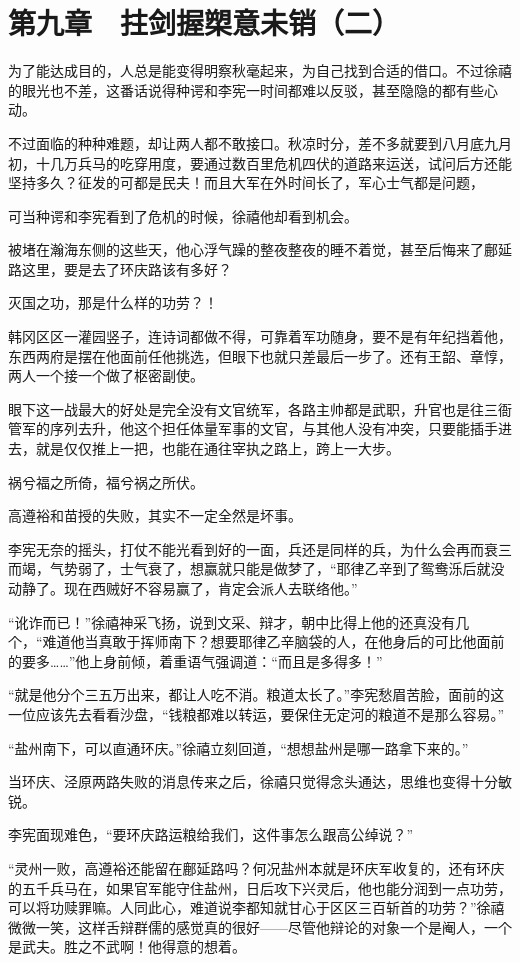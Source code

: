 \section{第九章　拄剑握槊意未销（二）}

为了能达成目的，人总是能变得明察秋毫起来，为自己找到合适的借口。不过徐禧的眼光也不差，这番话说得种谔和李宪一时间都难以反驳，甚至隐隐的都有些心动。

不过面临的种种难题，却让两人都不敢接口。秋凉时分，差不多就要到八月底九月初，十几万兵马的吃穿用度，要通过数百里危机四伏的道路来运送，试问后方还能坚持多久？征发的可都是民夫！而且大军在外时间长了，军心士气都是问题，

可当种谔和李宪看到了危机的时候，徐禧他却看到机会。

被堵在瀚海东侧的这些天，他心浮气躁的整夜整夜的睡不着觉，甚至后悔来了鄜延路这里，要是去了环庆路该有多好？

灭国之功，那是什么样的功劳？！

韩冈区区一灌园竖子，连诗词都做不得，可靠着军功随身，要不是有年纪挡着他，东西两府是摆在他面前任他挑选，但眼下也就只差最后一步了。还有王韶、章惇，两人一个接一个做了枢密副使。

眼下这一战最大的好处是完全没有文官统军，各路主帅都是武职，升官也是往三衙管军的序列去升，他这个担任体量军事的文官，与其他人没有冲突，只要能插手进去，就是仅仅推上一把，也能在通往宰执之路上，跨上一大步。

祸兮福之所倚，福兮祸之所伏。

高遵裕和苗授的失败，其实不一定全然是坏事。

李宪无奈的摇头，打仗不能光看到好的一面，兵还是同样的兵，为什么会再而衰三而竭，气势弱了，士气衰了，想赢就只能是做梦了，“耶律乙辛到了鸳鸯泺后就没动静了。现在西贼好不容易赢了，肯定会派人去联络他。”

“讹诈而已！”徐禧神采飞扬，说到文采、辩才，朝中比得上他的还真没有几个，“难道他当真敢于挥师南下？想要耶律乙辛脑袋的人，在他身后的可比他面前的要多……”他上身前倾，着重语气强调道：“而且是多得多！”

“就是他分个三五万出来，都让人吃不消。粮道太长了。”李宪愁眉苦脸，面前的这一位应该先去看看沙盘，“钱粮都难以转运，要保住无定河的粮道不是那么容易。”

“盐州南下，可以直通环庆。”徐禧立刻回道，“想想盐州是哪一路拿下来的。”

当环庆、泾原两路失败的消息传来之后，徐禧只觉得念头通达，思维也变得十分敏锐。

李宪面现难色，“要环庆路运粮给我们，这件事怎么跟高公绰说？”

“灵州一败，高遵裕还能留在鄜延路吗？何况盐州本就是环庆军收复的，还有环庆的五千兵马在，如果官军能守住盐州，日后攻下兴灵后，他也能分润到一点功劳，可以将功赎罪嘛。人同此心，难道说李都知就甘心于区区三百斩首的功劳？”徐禧微微一笑，这样舌辩群儒的感觉真的很好——尽管他辩论的对象一个是阉人，一个是武夫。胜之不武啊！他得意的想着。

